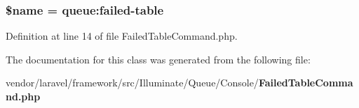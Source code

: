 \subsubsection[{\$name}]{\setlength{\rightskip}{0pt plus 5cm}\${\bf name} = \textquotesingle{}queue\+:failed-\/{\bf table}\textquotesingle{}\hspace{0.3cm}{\ttfamily [protected]}}\label{class_illuminate_1_1_queue_1_1_console_1_1_failed_table_command_ab2fc40d43824ea3e1ce5d86dee0d763b}


Definition at line 14 of file Failed\+Table\+Command.\+php.



The documentation for this class was generated from the following file\+:\begin{DoxyCompactItemize}
\item 
vendor/laravel/framework/src/\+Illuminate/\+Queue/\+Console/{\bf Failed\+Table\+Command.\+php}\end{DoxyCompactItemize}
